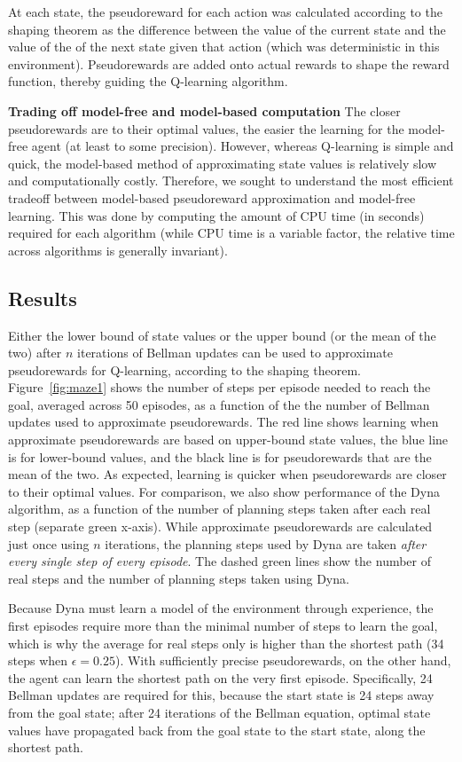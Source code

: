 \documentclass[letterpaper]{article}
\begin{document}
At each state, the pseudoreward for each action was calculated according to the shaping theorem as the difference between the value of the current state and the value of the of the next state given that action (which was deterministic in this environment). Pseudorewards are added onto actual rewards to shape the reward function, thereby guiding the Q-learning algorithm.

\noindent
\textbf{Trading off model-free and model-based computation} The closer pseudorewards are to their optimal values, the easier the learning for the model-free agent (at least to some precision). However, whereas Q-learning is simple and quick, the model-based method of approximating state values is relatively slow and computationally costly. Therefore, we sought to understand the most efficient tradeoff between model-based pseudoreward approximation and model-free learning. This was done by computing the amount of CPU time (in seconds) required for each algorithm (while CPU time is a variable factor, the relative time across algorithms is generally invariant).

\subsection{Results}

Either the lower bound of state values or the upper bound (or the mean of the two) after $n$ iterations of Bellman updates can be used to approximate pseudorewards for Q-learning, according to the shaping theorem. Figure~\ref{fig:maze1} shows the number of steps per episode needed to reach the goal, averaged across 50 episodes, as a function of the the number of Bellman updates used to approximate pseudorewards. The red line shows learning when approximate pseudorewards are based on upper-bound state values, the blue line is for lower-bound values, and the black line is for pseudorewards that are the mean of the two. As expected, learning is quicker when pseudorewards are closer to their optimal values. For comparison, we also show performance of the Dyna algorithm, as a function of the number of planning steps taken after each real step (separate green x-axis). While approximate pseudorewards are calculated just once using $n$ iterations, the planning steps used by Dyna are taken \textit{after every single step of every episode}. The dashed green lines show the number of real steps and the number of planning steps taken using Dyna.

Because Dyna must learn a model of the environment through experience, the first episodes require more than the minimal number of steps to learn the goal, which is why the average for real steps only is higher than the shortest path (34 steps when $\epsilon=0.25$). With sufficiently precise pseudorewards, on the other hand, the agent can learn the shortest path on the very first episode. Specifically, 24 Bellman updates are required for this, because the start state is 24 steps away from the goal state; after 24 iterations of the Bellman equation, optimal state values have propagated back from the goal state to the start state, along the shortest path.
\end{document}
